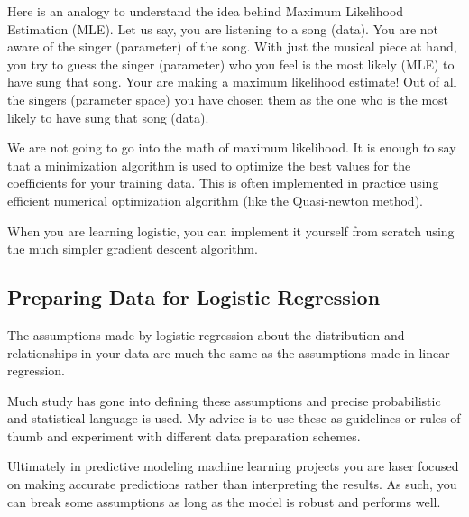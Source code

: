 \documentclass[
  letterpaper,
  DIV=11,
  numbers=noendperiod]{scrreprt}
\begin{document}
Here is an analogy to understand the idea behind Maximum Likelihood
Estimation (MLE). Let us say, you are listening to a song (data). You
are not aware of the singer (parameter) of the song. With just the
musical piece at hand, you try to guess the singer (parameter) who you
feel is the most likely (MLE) to have sung that song. Your are making a
maximum likelihood estimate! Out of all the singers (parameter space)
you have chosen them as the one who is the most likely to have sung that
song (data).

We are not going to go into the math of maximum likelihood. It is enough
to say that a minimization algorithm is used to optimize the best values
for the coefficients for your training data. This is often implemented
in practice using efficient numerical optimization algorithm (like the
Quasi-newton method).

When you are learning logistic, you can implement it yourself from
scratch using the much simpler gradient descent algorithm.

\subsection{Preparing Data for Logistic
Regression}\label{preparing-data-for-logistic-regression}

The assumptions made by logistic regression about the distribution and
relationships in your data are much the same as the assumptions made in
linear regression.

Much study has gone into defining these assumptions and precise
probabilistic and statistical language is used. My advice is to use
these as guidelines or rules of thumb and experiment with different data
preparation schemes.

Ultimately in predictive modeling machine learning projects you are
laser focused on making accurate predictions rather than interpreting
the results. As such, you can break some assumptions as long as the
model is robust and performs well.
\end{document}
